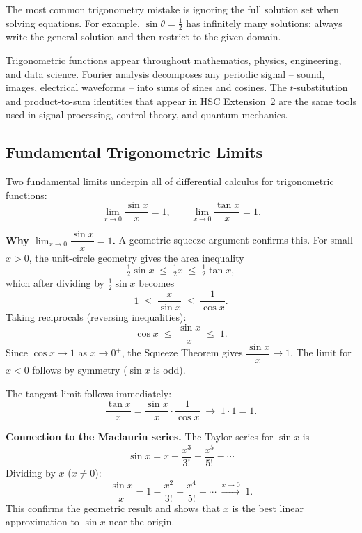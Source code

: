 \documentclass[12pt]{article}
\newenvironment{remark}[1][]{%
  \begin{remarkbox}[title={\bfseries Remark~\thetcbcounter\ifx\relax#1\relax\else\ (#1)\fi}]%
}{%
  \end{remarkbox}%
}
\begin{document}
\begin{remark}
The most common trigonometry mistake is ignoring the full solution set when solving equations. For example, $\sin\theta = \tfrac{1}{2}$ has infinitely many solutions; always write the general solution and then restrict to the given domain.
\end{remark}

\begin{remark}[Why trigonometry matters beyond the HSC]
Trigonometric functions appear throughout mathematics, physics, engineering, and data science. Fourier analysis decomposes any periodic signal -- sound, images, electrical waveforms -- into sums of sines and cosines. The $t$-substitution and product-to-sum identities that appear in HSC Extension~2 are the same tools used in signal processing, control theory, and quantum mechanics.
\end{remark}

\subsection{Fundamental Trigonometric Limits}

Two fundamental limits underpin all of differential calculus for trigonometric functions:
\[
\lim_{x \to 0} \frac{\sin x}{x} = 1,
\qquad
\lim_{x \to 0} \frac{\tan x}{x} = 1.
\]

\textbf{Why $\lim_{x \to 0} \dfrac{\sin x}{x} = 1$.}
A geometric squeeze argument confirms this. For small $x > 0$, the unit-circle geometry gives the area inequality
\[
\tfrac{1}{2}\sin x \;\le\; \tfrac{1}{2}x \;\le\; \tfrac{1}{2}\tan x,
\]
which after dividing by $\tfrac{1}{2}\sin x$ becomes
\[
1 \;\le\; \frac{x}{\sin x} \;\le\; \frac{1}{\cos x}.
\]
Taking reciprocals (reversing inequalities):
\[
\cos x \;\le\; \frac{\sin x}{x} \;\le\; 1.
\]
Since $\cos x \to 1$ as $x \to 0^+$, the Squeeze Theorem gives $\dfrac{\sin x}{x} \to 1$. The limit for $x < 0$ follows by symmetry ($\sin x$ is odd).

The tangent limit follows immediately:
\[
\frac{\tan x}{x}
= \frac{\sin x}{x}\cdot\frac{1}{\cos x}
\;\longrightarrow\; 1\cdot 1 = 1.
\]

\textbf{Connection to the Maclaurin series.}
The Taylor series for $\sin x$ is
\[
\sin x = x - \frac{x^3}{3!} + \frac{x^5}{5!} - \cdots
\]
Dividing by $x$ ($x\neq 0$):
\[
\frac{\sin x}{x} = 1 - \frac{x^2}{3!} + \frac{x^4}{5!} - \cdots \;\xrightarrow{x\to 0}\; 1.
\]
This confirms the geometric result and shows that $x$ is the best linear approximation to $\sin x$ near the origin.
\end{document}
